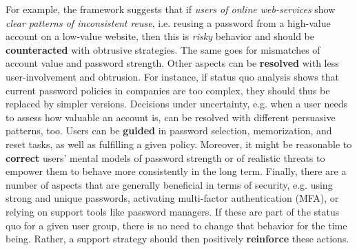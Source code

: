 \vspace*{1em}
\noindent
{}
\vspace*{1em}

\noindent For example, the framework suggests that if \textit{users of online web-services} show \textit{clear patterns of inconsistent reuse}, i.e. reusing a password from a high-value account on a low-value website, then this is \textit{risky }behavior and should be \textbf{counteracted} with obtrusive strategies. The same goes for mismatches of account value and password strength. Other aspects can be \textbf{resolved} with less user-involvement and obtrusion. For instance, if status quo analysis shows that current password policies in companies are too complex, they should thus be replaced by simpler versions. Decisions under uncertainty, e.g. when a user needs to assess how valuable an account is, can be resolved with different persuasive patterns, too. Users can be \textbf{guided} in password selection, memorization, and reset tasks, as well as fulfilling a given policy. Moreover, it might be reasonable to \textbf{correct} users' mental models of password strength or of realistic threats to empower them to behave more consistently in the long term. Finally, there are a number of aspects that are generally beneficial in terms of security, e.g. using strong and unique passwords, activating multi-factor authentication (MFA), or relying on support tools like password managers. If these are part of the status quo for a given user group, there is no need to change that behavior for the time being. Rather, a support strategy should then positively \textbf{reinforce} these actions. 

